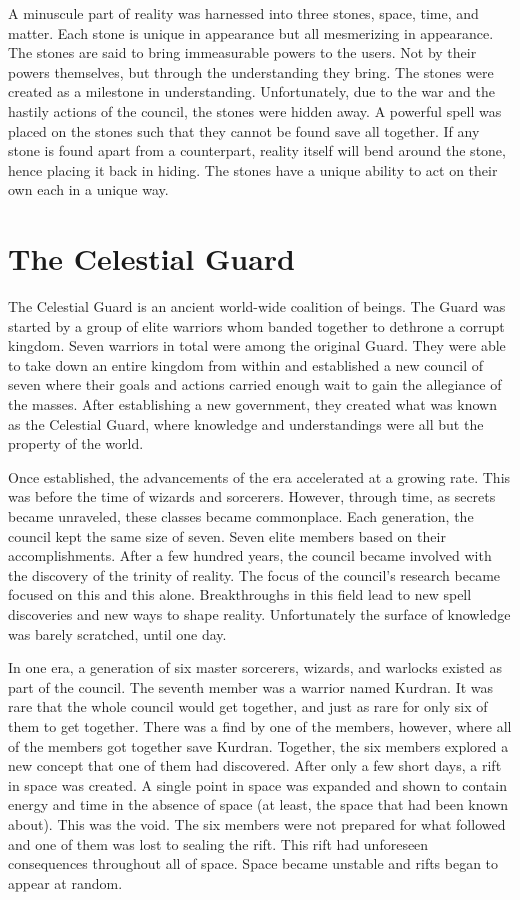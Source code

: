 A minuscule part of reality was harnessed into three stones, space, time, and matter. Each stone is unique in appearance but all mesmerizing in appearance. The stones are said to bring immeasurable powers to the users. Not by their powers themselves, but through the understanding they bring. The stones were created as a milestone in understanding. Unfortunately, due to the war and the hastily actions of the council, the stones were hidden away. A powerful spell was placed on the stones such that they cannot be found save all together. If any stone is found apart from a counterpart, reality itself will bend around the stone, hence placing it back in hiding. The stones have a unique ability to act on their own each in a unique way. 

\section{The Celestial Guard}

The Celestial Guard is an ancient world-wide coalition of beings. The Guard was started by a group of elite warriors whom banded together to dethrone a corrupt kingdom. Seven warriors in total were among the original Guard. They were able to take down an entire kingdom from within and established a new council of seven where their goals and actions carried enough wait to gain the allegiance of the masses. After establishing a new government, they created what was known as the Celestial Guard, where knowledge and understandings were all but the property of the world. 

Once established, the advancements of the era accelerated at a growing rate. This was before the time of wizards and sorcerers. However, through time, as secrets became unraveled, these classes became commonplace. Each generation, the council kept the same size of seven. Seven elite members based on their accomplishments. After a few hundred years, the council became involved with the discovery of the trinity of reality. The focus of the council's research became focused on this and this alone. Breakthroughs in this field lead to new spell discoveries and new ways to shape reality. Unfortunately the surface of knowledge was barely scratched, until one day.

In one era, a generation of six master sorcerers, wizards, and warlocks existed as part of the council. The seventh member was a warrior named Kurdran. It was rare that the whole council would get together, and just as rare for only six of them to get together. There was a find by one of the members, however, where all of the members got together save Kurdran. Together, the six members explored a new concept that one of them had discovered. After only a few short days, a rift in space was created. A single point in space was expanded and shown to contain energy and time in the absence of space (at least, the space that had been known about). This was the void. The six members were not prepared for what followed and one of them was lost to sealing the rift. This rift had unforeseen consequences throughout all of space. Space became unstable and rifts began to appear at random.

